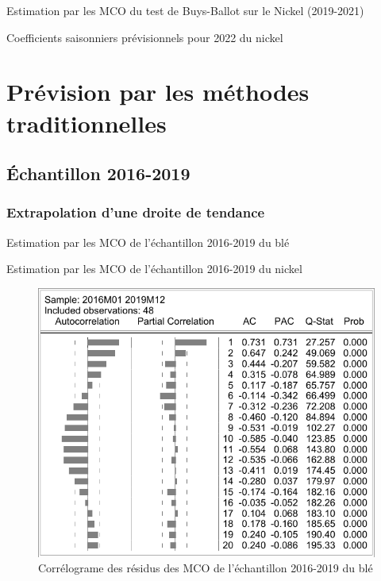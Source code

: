 \documentclass[12pt,a4paper]{article}
\begin{document}
\begin{table}[H]
    \centering
    \caption{Estimation par les MCO du test de Buys-Ballot sur le Nickel (2019-2021)}
    \label{tab:bb_test}
    \sffamily
    \resizebox{0.8\textwidth}{!}{}
\end{table}

\begin{table}[H]
    \centering
    \caption{Coefficients saisonniers prévisionnels pour 2022 du nickel}
    \label{tab:coef_saiso}
    \sffamily
    \resizebox{0.8\textwidth}{!}{}
\end{table}

\section{Prévision par les méthodes traditionnelles}
\setcounter{table}{0}
\setcounter{figure}{0}
\subsection{Échantillon 2016-2019}
\subsubsection{Extrapolation d'une droite de tendance}\label{appendix:extra_19}
\begin{table}[H]
    \centering
    \caption{Estimation par les MCO de l'échantillon 2016-2019 du blé}
    \label{tab:mco_ble19}
    \sffamily
    
\end{table}

\begin{table}[H]
    \centering
    \caption{Estimation par les MCO de l'échantillon 2016-2019 du nickel}
    \label{tab:mco_nickel19}
    \sffamily
    
\end{table}

\begin{figure}[H]
    \centering
    \includegraphics[]{annexe/3_1_extra_cor_ble19.pdf}
    \caption{Corrélograme des résidus des MCO de l'échantillon 2016-2019 du blé}
\end{figure}
\end{document}
